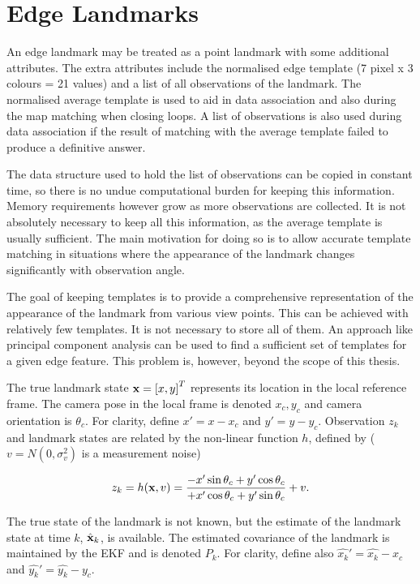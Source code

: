 \section{Edge Landmarks}

An edge landmark may be treated as a point landmark with some
additional attributes. The extra attributes include the normalised
edge template (7 pixel x 3 colours = 21 values) and a list of all
observations of the landmark.  The normalised average template is used
to aid in data association and also during the map matching when
closing loops. A list of observations is also used during data
association if the result of matching with the average template failed
to produce a definitive answer.

The data structure used to hold the list of observations can be copied
in constant time, so there is no undue computational burden for
keeping this information. Memory requirements however grow as more
observations are collected. It is not absolutely necessary to keep all
this information, as the average template is usually sufficient. The
main motivation for doing so is to allow accurate template matching in
situations where the appearance of the landmark changes significantly
with observation angle.

The goal of keeping templates is to provide a comprehensive
representation of the appearance of the landmark from various view
points. This can be achieved with relatively few templates. It is not
necessary to store all of them. An approach like principal component
analysis \cite{jolliffe2002pca} can be used to find a sufficient set
of templates for a given edge feature. This problem is, however, beyond
the scope of this thesis.

The true landmark state ${\bf x} = \left[x,y \right]^T$ represents its
location in the local reference frame. The camera pose in the local frame
is denoted $x_c,y_c$ and camera orientation is $\theta_c$. For clarity,
define $x'=x-x_c$ and $y'=y-y_c$. Observation $z_k$ and
landmark states are related by the non-linear function $h$, defined by
($v = N(0,\sigma_{v}^2)$ is a measurement noise)

$$
z_k = h({\bf x},v) =
\frac{-x'\sin \theta_c + y' \cos \theta_c }
     {+x'\cos \theta_c + y' \sin \theta_c } + v.
$$

The true state of the landmark is not known, but the estimate of the
landmark state at time $k$, $\hat{\bf x}_k$, is available. The
estimated covariance of the landmark is maintained by the EKF
and is denoted $P_k$. For clarity, define also
$\hat{x_k}'=\hat{x_k}-x_c$ and $\hat{y_k}'=\hat{y_k}-y_c$.


